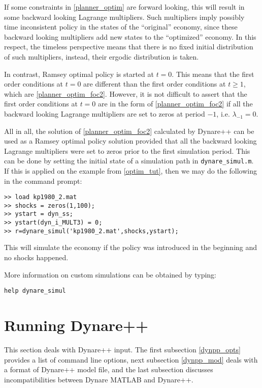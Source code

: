 \documentclass[10pt]{article}
\begin{document}
If some constraints in \eqref{planner_optim} are forward looking, this
will result in some backward looking Lagrange multipliers. Such
multipliers imply possibly time inconsistent policy in the states of
the ``original'' economy, since these backward looking multipliers add
new states to the ``optimized'' economy. In this respect, the timeless
perspective means that there is no fixed initial distribution of such
multipliers, instead, their ergodic distribution is taken.

In contrast, Ramsey optimal policy is started at $t=0$. This means
that the first order conditions at $t=0$ are different than the first
order conditions at $t\geq 1$, which are
\eqref{planner_optim_foc2}. However, it is not difficult to assert
that the first order conditions at $t=0$ are in the form of
\eqref{planner_optim_foc2} if all the backward looking Lagrange
multipliers are set to zeros at period $-1$, i.e. $\lambda_{-1}=0$.

All in all, the solution of \eqref{planner_optim_foc2} calculated by
Dynare++ can be used as a Ramsey optimal policy solution provided that
all the backward looking Lagrange multipliers were set to zeros prior
to the first simulation period. This can be done by setting the
initial state of a simulation path in {\tt dynare\_simul.m}. If this
is applied on the example from \ref{optim_tut}, then we may do the
following in the command prompt:
{\small
\begin{verbatim}
>> load kp1980_2.mat
>> shocks = zeros(1,100);
>> ystart = dyn_ss;
>> ystart(dyn_i_MULT3) = 0;
>> r=dynare_simul('kp1980_2.mat',shocks,ystart);
\end{verbatim}
}
This will simulate the economy if the policy was introduced in the
beginning and no shocks happened.

More information on custom simulations can be obtained by typing:
{\small
\begin{verbatim}
help dynare_simul
\end{verbatim}
}


\section{Running Dynare++}

This section deals with Dynare++ input. The first subsection
\ref{dynpp_opts} provides a list of command line options, next
subsection \ref{dynpp_mod} deals with a format of Dynare++ model file,
and the last subsection discusses incompatibilities between Dynare
MATLAB and Dynare++.
\end{document}
